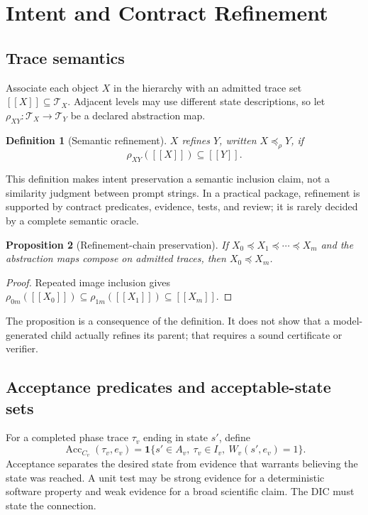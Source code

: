 \documentclass[11pt]{article}
\newtheorem{definition}{Definition}[section]
\newtheorem{proposition}[definition]{Proposition}
\newcommand{\Trace}{\mathcal T}
\newcommand{\Acc}{\operatorname{Acc}}
\newcommand{\llbracket}{[\![}
\newcommand{\rrbracket}{]\!]}
\begin{document}
\section{Intent and Contract Refinement}
\subsection{Trace semantics}
Associate each object $X$ in the hierarchy with an admitted trace set $\llbracket X\rrbracket\subseteq\Trace_X$. Adjacent levels may use different state descriptions, so let $\rho_{XY}:\Trace_X\to\Trace_Y$ be a declared abstraction map.
\begin{definition}[Semantic refinement]
$X$ refines $Y$, written $X\preceq_{\rho}Y$, if
\[
\rho_{XY}(\llbracket X\rrbracket)\subseteq \llbracket Y\rrbracket.
\]
\end{definition}
This definition makes intent preservation a semantic inclusion claim, not a similarity judgment between prompt strings. In a practical package, refinement is supported by contract predicates, evidence, tests, and review; it is rarely decided by a complete semantic oracle.

\begin{proposition}[Refinement-chain preservation]
If $X_0\preceq X_1\preceq\cdots\preceq X_m$ and the abstraction maps compose on admitted traces, then $X_0\preceq X_m$.
\end{proposition}
\begin{proof}
Repeated image inclusion gives
$\rho_{0m}(\llbracket X_0\rrbracket)\subseteq\rho_{1m}(\llbracket X_1\rrbracket)\subseteq\llbracket X_m\rrbracket$.
\end{proof}
The proposition is a consequence of the definition. It does not show that a model-generated child actually refines its parent; that requires a sound certificate or verifier.

\subsection{Acceptance predicates and acceptable-state sets}
For a completed phase trace $\tau_v$ ending in state $s'$, define
\[
\Acc_{C_v}(\tau_v,e_v)=\mathbf 1\{s'\in A_v,\ \tau_v\in I_v,\ W_v(s',e_v)=1\}.
\]
Acceptance separates the desired state from evidence that warrants believing the state was reached. A unit test may be strong evidence for a deterministic software property and weak evidence for a broad scientific claim. The DIC must state the connection.
\end{document}
